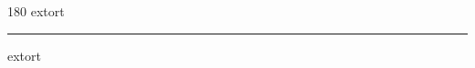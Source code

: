 
\begin{frame}
\begin{center}
\begin{turn}{180}
{\fontsize{2.5cm}{1em}\selectfont extort}
\end{turn}
\vspace{1em}\par  
\hrule
\vspace{1em}\par  
{\fontsize{2.5cm}{1em}\selectfont extort}
\end{center}
\end{frame}
